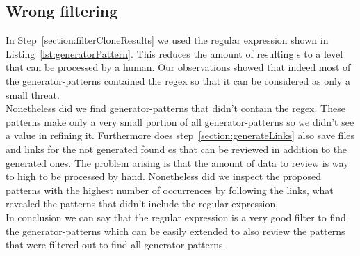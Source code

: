 \subsection{Wrong filtering}
In Step~\ref{section:filterCloneResults} we used the regular expression shown in Listing~\ref{lst:generatorPattern}. This reduces the amount of resulting s to a level that can be processed by a human. Our observations showed that indeed most of the generator-patterns contained the regex so that it can be considered as only a small threat.\\
Nonetheless did we find generator-patterns that didn't contain the regex. These patterns make only a very small portion of all generator-patterns so we didn't see a value in refining it. Furthermore does step~\ref{section:generateLinks} also save files and links for the not generated found es that can be reviewed in addition to the generated ones. The problem arising is that the amount of data to review is way to high to be processed by hand. Nonetheless did we inspect the proposed patterns with the highest number of occurrences by following the links, what revealed the patterns that didn't include the regular expression.\\
In conclusion we can say that the regular expression is a very good filter to find the generator-patterns which can be easily extended to also review the patterns that were filtered out to find all generator-patterns.

